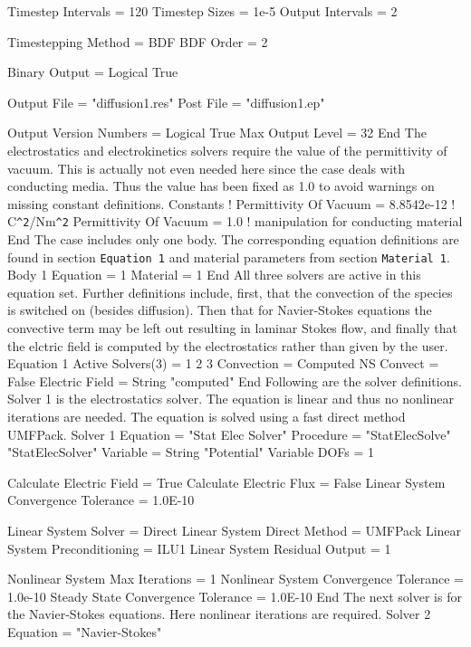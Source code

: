   Timestep Intervals = 120
  Timestep Sizes = 1e-5  
  Output Intervals = 2

  Timestepping Method = BDF
  BDF Order = 2

  Binary Output = Logical True

  Output File = "diffusion1.res"
  Post File = "diffusion1.ep"

  Output Version Numbers = Logical True
  Max Output Level = 32
End
\ttend
%
The electrostatics and electrokinetics solvers require the value of
the permittivity of vacuum. This is actually not even needed here
since the case deals with conducting media. Thus the value has been
fixed as 1.0 to avoid warnings on missing constant definitions.
%
\ttbegin
Constants
!  Permittivity Of Vacuum = 8.8542e-12  ! C\verb|^2|/Nm\verb*|^2|
  Permittivity Of Vacuum = 1.0 ! manipulation for conducting material
End
\ttend
%
The case includes only one body. The corresponding equation definitions are
found in section \texttt{Equation 1} and material parameters from
section \texttt{Material 1}.
%
\ttbegin
Body 1
  Equation = 1
  Material = 1
End
\ttend
%
All three solvers are active in this equation set. Further definitions
include, first, that the convection of the species is switched on
(besides diffusion). Then that for Navier-Stokes equations the
convective term may be left out resulting in laminar Stokes flow, and
finally that the elctric field is computed by the electrostatics
rather than given by the user.
%
\ttbegin
Equation 1
  Active Solvers(3) = 1 2 3
  Convection = Computed
  NS Convect = False
  Electric Field = String "computed"
End
\ttend
%
Following are the solver definitions. Solver 1 is the electrostatics
solver. The equation is linear and thus no nonlinear iterations are
needed. The equation is solved using a fast direct method UMFPack.
%
\ttbegin
Solver 1  
  Equation = "Stat Elec Solver"
  Procedure = "StatElecSolve" "StatElecSolver"
  Variable = String "Potential"
  Variable DOFs = 1

  Calculate Electric Field = True
  Calculate Electric Flux = False
  Linear System Convergence Tolerance = 1.0E-10

  Linear System Solver = Direct
  Linear System Direct Method = UMFPack 
  Linear System Preconditioning = ILU1
  Linear System Residual Output = 1

  Nonlinear System Max Iterations = 1
  Nonlinear System Convergence Tolerance = 1.0e-10
  Steady State Convergence Tolerance =  1.0E-10
End
\ttend
%
The next solver is for the Navier-Stokes equations. Here nonlinear
iterations are required.
\ttbegin
Solver 2
  Equation = "Navier-Stokes"

